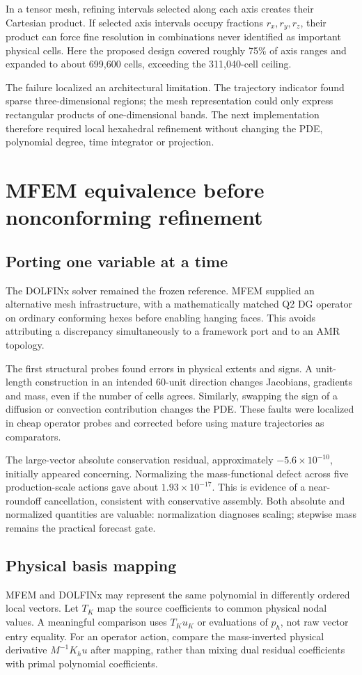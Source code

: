In a tensor mesh, refining intervals selected along each axis creates their Cartesian product. If selected axis intervals occupy fractions $r_x,r_y,r_z$, their product can force fine resolution in combinations never identified as important physical cells. Here the proposed design covered roughly 75\% of axis ranges and expanded to about 699,600 cells, exceeding the 311,040-cell ceiling.

The failure localized an architectural limitation. The trajectory indicator found sparse three-dimensional regions; the mesh representation could only express rectangular products of one-dimensional bands. The next implementation therefore required local hexahedral refinement without changing the PDE, polynomial degree, time integrator or projection.

\chapter{MFEM equivalence before nonconforming refinement}
\section{Porting one variable at a time}
The DOLFINx solver remained the frozen reference. MFEM supplied an alternative mesh infrastructure, with a mathematically matched Q2 DG operator on ordinary conforming hexes before enabling hanging faces. This avoids attributing a discrepancy simultaneously to a framework port and to an AMR topology.

The first structural probes found errors in physical extents and signs. A unit-length construction in an intended 60-unit direction changes Jacobians, gradients and mass, even if the number of cells agrees. Similarly, swapping the sign of a diffusion or convection contribution changes the PDE. These faults were localized in cheap operator probes and corrected before using mature trajectories as comparators.

The large-vector absolute conservation residual, approximately $-5.6\times10^{-10}$, initially appeared concerning. Normalizing the mass-functional defect across five production-scale actions gave about $1.93\times10^{-17}$. This is evidence of a near-roundoff cancellation, consistent with conservative assembly. Both absolute and normalized quantities are valuable: normalization diagnoses scaling; stepwise mass remains the practical forecast gate.

\section{Physical basis mapping}
MFEM and DOLFINx may represent the same polynomial in differently ordered local vectors. Let $T_K$ map the source coefficients to common physical nodal values. A meaningful comparison uses $T_Ku_K$ or evaluations of $p_h$, not raw vector entry equality. For an operator action, compare the mass-inverted physical derivative $M^{-1}K_hu$ after mapping, rather than mixing dual residual coefficients with primal polynomial coefficients.

